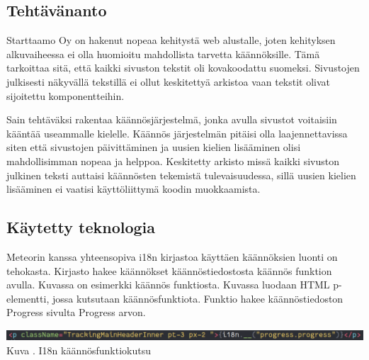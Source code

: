 \documentclass[11pt,a4paper,titlepage,oneside]{article}
\begin{document}


\subsection{Tehtävänanto}


Starttaamo Oy on hakenut nopeaa kehitystä web alustalle, joten kehityksen alkuvaiheessa 
ei olla huomioitu mahdollista tarvetta käännöksille. 
Tämä tarkoittaa sitä, että kaikki sivuston tekstit oli kovakoodattu suomeksi.
Sivustojen julkisesti näkyvällä tekstillä ei ollut keskitettyä arkistoa vaan tekstit olivat sijoitettu komponentteihin.
\medskip

Sain tehtäväksi rakentaa käännösjärjestelmä, jonka avulla sivustot voitaisiin kääntää useammalle kielelle.
Käännös järjestelmän pitäisi olla laajennettavissa siten että sivustojen päivittäminen ja uusien kielien lisääminen 
olisi mahdollisimman nopeaa ja helppoa.
Keskitetty arkisto missä kaikki sivuston julkinen teksti auttaisi käännösten tekemistä tulevaisuudessa,
sillä uusien kielien lisääminen ei vaatisi käyttöliittymä koodin muokkaamista.







\subsection{Käytetty teknologia}





Meteorin kanssa yhteensopiva i18n kirjastoa käyttäen käännöksien luonti on tehokasta.
Kirjasto hakee käännökset käännöstiedostosta käännös funktion avulla.
Kuvassa \nextImageCount{} on esimerkki käännös funktiosta.
Kuvassa luodaan HTML p-elementti, jossa kutsutaan käännösfunktiota. 
Funktio hakee käännöstiedoston Progress sivulta Progress arvon.\\
\medskip

\bigskip
\includegraphics[width = 15cm]{src/public/oppar/translationcall.png}\\
Kuva \getImgCount. {} I18n käännösfunktiokutsu 
\medskip
\end{document}
